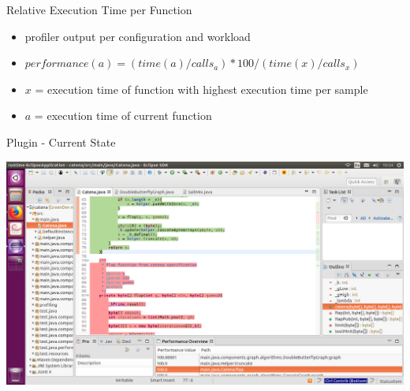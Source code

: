 \documentclass[11pt,aspectratio=169]{beamer}
\begin{document}
\begin{frame}{Relative Execution Time per Function}
  \begin{itemize}
    \item profiler output per configuration and workload
    \item $performance(a) = (time(a)/calls_a)*100/(time(x)/calls_x)$
    \item $x$ = execution time of function with highest execution time per sample
    \item $a$ = execution time of current function
  \end{itemize}
\end{frame}


\begin{frame}{Plugin - Current State}
  \begin{center}
    \includegraphics[height=0.83\textheight]{./images/catena_max_all_cfgs}
  \end{center}
\end{frame}

\end{document}
